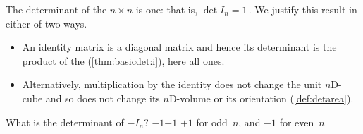 \begin{example} \label{eg:detident}
The determinant of the \(n\times n\)  is one: that is, \(\det I_n=1\)\,. 
We justify this result in either of two ways.
\begin{itemize}
\item An identity matrix is a diagonal matrix and hence its determinant is the product of the  (\cref{thm:basicdet:i}), here all ones. 
\item Alternatively, multiplication by the identity does not change the unit $n$D-cube and so does not change its $n$D-volume or its orientation (\cref{def:detarea}).
\end{itemize}
\end{example}





\begin{activity}
What is the determinant of \(-I_n\)?
{\(-1\)}{\(+1\)}
{\(+1\) for odd~\(n\), and \(-1\) for even~\(n\)}
\end{activity}






